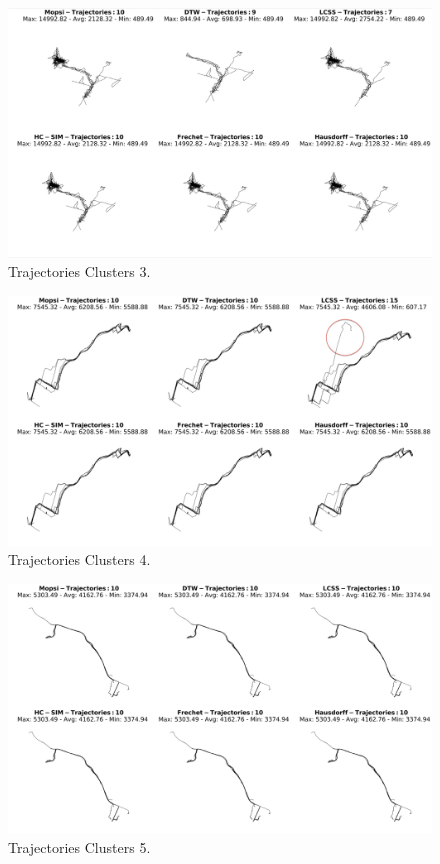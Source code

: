 \documentclass[a4paper, 12pt]{article}
\begin{document}
\begin{figure}[htbp!]
    \centering
    \includegraphics[width=1\textwidth]{Mopsi Clusters 3.png}
    \caption{Trajectories Clusters 3.}
    \label{fig29}
\end{figure}

\begin{figure}[htbp!]
    \centering
    \includegraphics[width=1\textwidth]{Mopsi Clusters 4.png}
    \caption{Trajectories Clusters 4.}
    \label{fig30}
\end{figure}

\begin{figure}[htbp!]
    \centering
    \includegraphics[width=1\textwidth]{Mopsi Clusters 5.png}
    \caption{Trajectories Clusters 5.}
    \label{fig31}
\end{figure}
\end{document}
